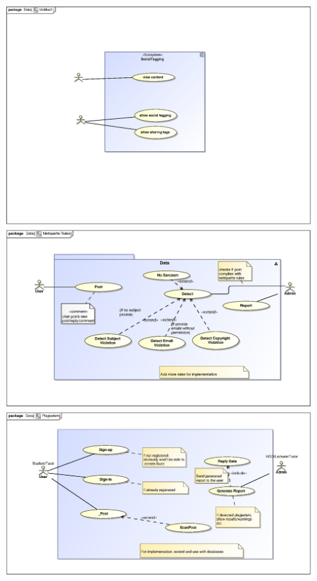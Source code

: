 \documentclass{scrreprt}
\begin{document}
\includegraphics[scale=.9]{Semaka_Use_Case.eps}\\
\includegraphics[scale=.9]{HlavuteloNetiquetteRules.eps}\\
\includegraphics[scale=.9]{HlavuteloPlagiarism.eps}\\
\end{document}
